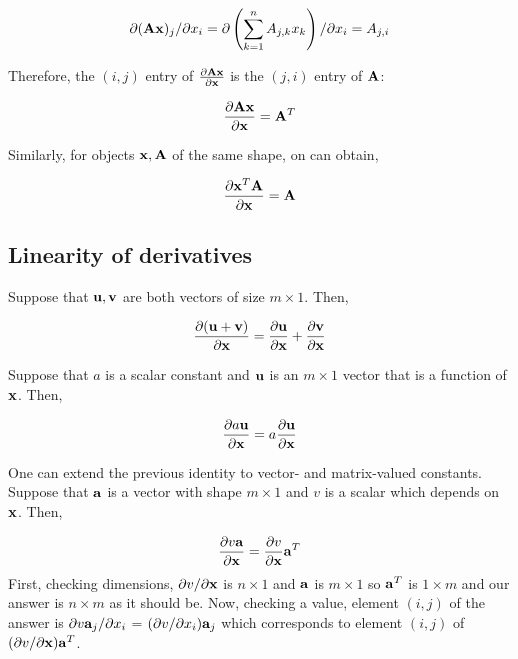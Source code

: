 \begin{align*}
  \partial ({\bf A} {\bf x})_j/\partial x_i = \partial \left( \sum_{k=1}^n A_{j,k} x_k \right)/ \partial x_i = A_{j,i}
\end{align*}

\noindent Therefore, the $(i,j)$ entry of $\frac{\partial {\bf A} {\bf x}}{\partial {\bf x}}$ is the $(j,i)$ entry of ${\bf A}$:

\begin{equation}
  \frac{\partial {\bf A} {\bf x}}{\partial {\bf x}} = {\bf A}^T \label{eq:Ax}
\end{equation}

\noindent Similarly, for objects ${\bf x}, {\bf A}$ of the same shape, on can obtain,

\begin{equation}
  \frac{\partial {\bf x}^T {\bf A}}{\partial {\bf x}} = {\bf A}
  \label{eq:xTA}
\end{equation}

\subsection{Linearity of derivatives}

Suppose that ${\bf u}, {\bf v}$ are both vectors of size $m \times 1$. Then,

\begin{equation}
  \frac{\partial ({\bf u} + {\bf v})}{\partial {\bf x}} = \frac{\partial
    {\bf u}}{\partial {\bf x}} + \frac{\partial {\bf v}}{\partial {\bf x}}
  \label{eq:uplusv}
\end{equation}

\noindent Suppose that $a$ is a scalar constant and ${\bf u}$ is an $m\times 1$ vector that is a function of ${\bf x}$. Then,

\begin{equation}\frac{\partial a {\bf u}}{\partial {\bf x}} = a \frac{\partial {\bf u}}{ \partial {\bf x}}\end{equation}

One can extend the previous identity to vector- and matrix-valued constants. Suppose that ${\bf a}$ is a vector with shape $m \times 1$ and $v$ is a scalar which depends on ${\bf x}$. Then,

\begin{equation}\frac{\partial v {\bf a}}{\partial {\bf x}} = \frac{\partial
    v}{\partial {\bf x}}{\bf a}^T\end{equation}
First, checking dimensions, $\partial v/\partial {\bf x}$ is $n \times
  1$ and ${\bf a}$ is $m \times 1$ so ${\bf a}^T$ is $1 \times m$ and our
answer is $n \times m$ as it should be.  Now, checking a value,
element $(i,j)$ of the answer is $\partial v {\bf a}_j / \partial x_i$ =
$(\partial v / \partial x_i) {\bf a}_j$ which corresponds to element
$(i,j)$ of $(\partial v / \partial {\bf x}){\bf a}^T$.

